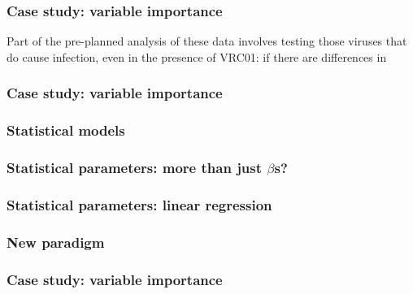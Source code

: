 \documentclass[12pt, 
hyperref={colorlinks=true, linkcolor=blue, urlcolor=cyan}]{beamer}
\begin{document}
\begin{frame}
\frametitle{Case study: variable importance}
Part of the pre-planned analysis of these data involves testing those viruses that do cause infection, even in the presence of VRC01: if there are differences in 
\end{frame}

\begin{frame}
\frametitle{Case study: variable importance}

\end{frame}

\begin{frame}
\frametitle{Statistical models}
\end{frame}

\begin{frame}
\frametitle{Statistical parameters: more than just $\beta$s?}
\end{frame}

\begin{frame}
\frametitle{Statistical parameters: linear regression}

\end{frame}

\begin{frame}
\frametitle{New paradigm}
\end{frame}

\begin{frame}
\frametitle{Case study: variable importance}
\end{frame}

\end{document}
